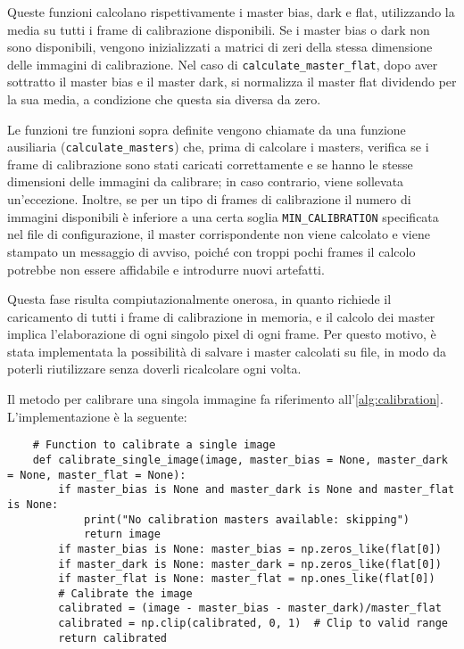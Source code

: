 Queste funzioni calcolano rispettivamente i master bias, dark e flat, utilizzando la media su tutti i frame di calibrazione disponibili. Se i master bias o dark non sono disponibili, vengono inizializzati a matrici di zeri della stessa dimensione delle immagini di calibrazione. Nel caso di \texttt{calculate\_master\_flat}, dopo aver sottratto il master bias e il master dark, si normalizza il master flat dividendo per la sua media, a condizione che questa sia diversa da zero.

Le funzioni tre funzioni sopra definite vengono chiamate da una funzione ausiliaria (\texttt{calculate\_masters}) che, prima di calcolare i masters, verifica se i frame di calibrazione sono stati caricati correttamente e se hanno le stesse dimensioni delle immagini da calibrare; in caso contrario, viene sollevata un'eccezione. Inoltre, se per un tipo di frames di calibrazione il numero di immagini disponibili è inferiore a una certa soglia \texttt{MIN\_CALIBRATION} specificata nel file di configurazione, il master corrispondente non viene calcolato e viene stampato un messaggio di avviso, poiché con troppi pochi frames il calcolo potrebbe non essere affidabile e introdurre nuovi artefatti.

Questa fase risulta compiutazionalmente onerosa, in quanto richiede il caricamento di tutti i frame di calibrazione in memoria, e il calcolo dei master implica l'elaborazione di ogni singolo pixel di ogni frame. Per questo motivo, è stata implementata la possibilità di salvare i master calcolati su file, in modo da poterli riutilizzare senza doverli ricalcolare ogni volta.

Il metodo per calibrare una singola immagine fa riferimento all'\cref{alg:calibration}. L'implementazione è la seguente:

\begin{lstlisting}
    # Function to calibrate a single image
    def calibrate_single_image(image, master_bias = None, master_dark = None, master_flat = None):
        if master_bias is None and master_dark is None and master_flat is None:
            print("No calibration masters available: skipping")
            return image
        if master_bias is None: master_bias = np.zeros_like(flat[0])
        if master_dark is None: master_dark = np.zeros_like(flat[0])
        if master_flat is None: master_flat = np.ones_like(flat[0])
        # Calibrate the image
        calibrated = (image - master_bias - master_dark)/master_flat
        calibrated = np.clip(calibrated, 0, 1)  # Clip to valid range
        return calibrated
\end{lstlisting}

